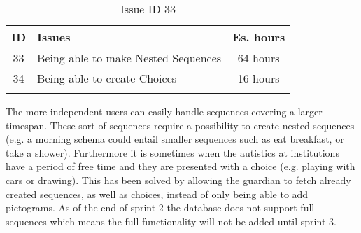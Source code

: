 \begin{longtable} { | c | p{12cm} | c | } 
\hline
	ID 	&	Issues	&		 Es. hours \\\hline
	33 	&	Being able to make Nested Sequences	&	64 hours \\\hline
	34 	&	Being able to create Choices	&	16 hours \\\hline
\caption{Issue ID 33}
\label{tab:spr2_nested}
\end{longtable}

The more independent users can easily handle sequences covering a larger timespan. These sort of sequences require a possibility to create nested sequences (e.g. a morning schema could entail smaller sequences such as eat breakfast, or take a shower). Furthermore it is sometimes when the autistics at institutions have a period of free time and they are presented with a choice (e.g. playing with cars or drawing).
This has been solved by allowing the guardian to fetch already created sequences, as well as choices, instead of only being able to add pictograms. As of the end of sprint 2 the database does not support full sequences which means the full functionality will not be added until sprint 3.




